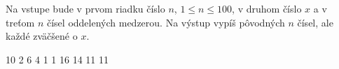 




Na vstupe bude v prvom riadku číslo $n$, $1\leq n\leq 100$, v druhom číslo $x$ a v treťom $n$ čísel oddelených medzerou.
Na výstup vypíš pôvodných $n$ čísel, ale každé zväčšené o $x$.

10
2 6 4 1 1
 16 14 11 11
\koniec


